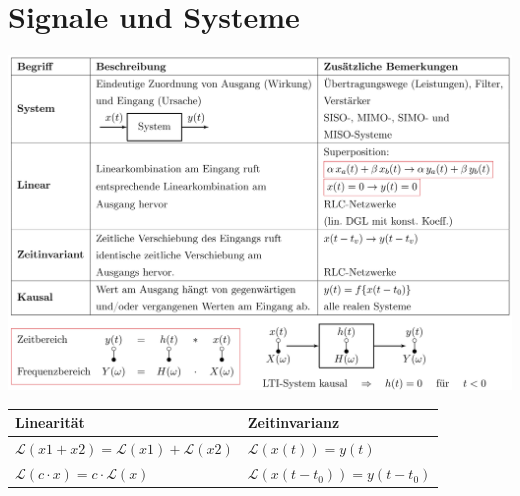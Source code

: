 \section{Signale und Systeme}
	
	\includegraphics[width=\textwidth]{./bilder/LTISystem.png}\\

	\begin{tabular}{|l|l|}
    	\hline
    	\textbf{Linearität} & \textbf{Zeitinvarianz}\\
    	\hline
    	$\mathcal{L}(x1+x2)=\mathcal{L}(x1)+\mathcal{L}(x2)$ & $\mathcal{L}(x(t)) = y(t)$ \\
    	$\mathcal{L}(c\cdot x)=c\cdot \mathcal{L}(x)$ & $\mathcal{L}(x(t-t_0)) = y(t-t_0)$ \\
		\hline    
    \end{tabular}
  			
		
